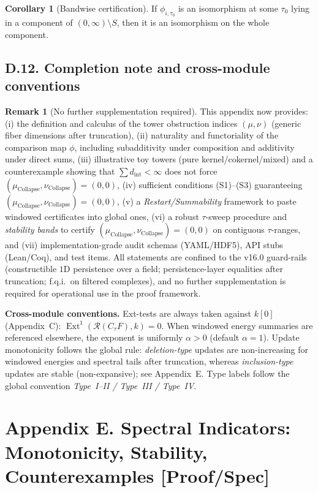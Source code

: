 \documentclass[11pt]{article}
\numberwithin{equation}{section}
\theoremstyle{plain}
\theoremstyle{definition}
\theoremstyle{remark}
\DeclareMathOperator{\Ext}{Ext}
\newcommand{\Rfun}{\mathcal{R}}
\theoremstyle{plain}
\theoremstyle{definition}
\numberwithin{equation}{section}
\newtheorem{corollary}[theorem]{Corollary}
\theoremstyle{definition}
\newtheorem{remark}[theorem]{Remark}
\DeclareRobustCommand{\muc}{\mu_{\mathrm{Collapse}}}
\DeclareRobustCommand{\nuc}{\nu_{\mathrm{Collapse}}}
\numberwithin{equation}{section}
\theoremstyle{plain}
\theoremstyle{definition}
\theoremstyle{remark}
\providecommand{\muc}{\mu_{\mathrm{Collapse}}}
\providecommand{\nuc}{\nu_{\mathrm{Collapse}}}
\begin{document}
\begin{corollary}[Bandwise certification]
If \(\phi_{i,\tau_0}\) is an isomorphism at some \(\tau_0\) lying in a component of \((0,\infty)\setminus S\), then it is an isomorphism on the whole component.
\end{corollary}

\subsection*{D.12. Completion note and cross-module conventions}

\begin{remark}[No further supplementation required]
This appendix now provides: (i) the definition and calculus of the tower obstruction indices \((\mu,\nu)\) (generic fiber dimensions after truncation), (ii) naturality and functoriality of the comparison map \(\phi\), including subadditivity under composition and additivity under direct sums, (iii) illustrative toy towers (pure kernel/cokernel/mixed) and a counterexample showing that \(\sum d_{\mathrm{int}}<\infty\) does not force \((\muc,\nuc)=(0,0)\), (iv) sufficient conditions (S1)–(S3) guaranteeing \((\muc,\nuc)=(0,0)\), (v) a \emph{Restart/Summability} framework to paste windowed certificates into global ones, (vi) a robust \(\tau\)-sweep procedure and \emph{stability bands} to certify \((\muc,\nuc)=(0,0)\) on contiguous \(\tau\)-ranges, and (vii) implementation-grade audit schemas (YAML/HDF5), API stubs (Lean/Coq), and test items.
All statements are confined to the v16.0 guard-rails (constructible \(1\)D persistence over a field; persistence-layer equalities after truncation; f.q.i.\ on filtered complexes), and no further supplementation is required for operational use in the proof framework.
\end{remark}

\medskip
\noindent\textbf{Cross-module conventions.}
Ext-tests are always taken against \(k[0]\) (Appendix~C): \(\Ext^1(\Rfun(C_\tau F),k)=0\).
When windowed energy summaries are referenced elsewhere, the exponent is uniformly \(\alpha>0\) (default \(\alpha=1\)).
Update monotonicity follows the global rule: \emph{deletion-type} updates are non-increasing for windowed energies and spectral tails after truncation, whereas \emph{inclusion-type} updates are stable (non-expansive); see Appendix~E.
Type labels follow the global convention \emph{Type~I–II / Type~III / Type~IV}.



\section*{Appendix E. Spectral Indicators: Monotonicity, Stability, Counterexamples [Proof/Spec]}
\end{document}
